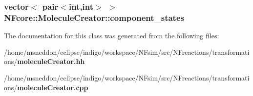 \subsubsection{\setlength{\rightskip}{0pt plus 5cm}vector$<$ pair$<$int,int$>$ $>$ {\bf NFcore::MoleculeCreator::component\_\-states}\hspace{0.3cm}{\tt  [protected]}}\label{classNFcore_1_1MoleculeCreator_cfb2469a83e222db950c819054f1c7ae}




The documentation for this class was generated from the following files:\begin{CompactItemize}
\item 
/home/msneddon/eclipse/indigo/workspace/NFsim/src/NFreactions/transformations/{\bf moleculeCreator.hh}\item 
/home/msneddon/eclipse/indigo/workspace/NFsim/src/NFreactions/transformations/{\bf moleculeCreator.cpp}\end{CompactItemize}
